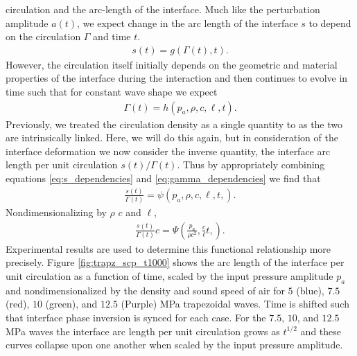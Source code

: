 \documentclass{jfm}%
\begin{document}
circulation and the arc-length of the interface. Much like the
perturbation amplitude $a(t)$, we expect change in the arc length of
the interface $s$ to depend on the circulation $\Gamma$ and time
$t$.
%
\begin{align}
  \label{eq:s_dependencies}%
  s(t) = g\left(\Gamma(t), t \right).%
\end{align}%
%
However, the circulation itself initially depends on the geometric and
material properties of the interface during the interaction and then
continues to evolve in time such that for constant wave shape we
expect
%
\begin{align}%
  \label{eq:gamma_dependencies}%
  \Gamma(t) = h\left(p_a, \rho, c, \ell, t\right).%
\end{align}%
%
Previously, we treated the circulation density as a single quantity to
as the two are intrinsically linked. Here, we will do this again, but
in consideration of the interface deformation we now consider the
inverse quantity, the interface arc length per unit circulation
$s(t)/\Gamma(t)$. Thus by appropriately combining equations
\eqref{eq:s_dependencies} and \eqref{eq:gamma_dependencies} we find
that
%
\begin{align}%
  \label{eq:scp_dependencies}%
  \frac{s(t)}{\Gamma(t)} = \psi\left(p_a,\rho, c, \ell, t,\right).
\end{align}%
%
Nondimensionalizing by $\rho$ $c$ and $\ell$,
%
\begin{align}%
  \label{eq:scp_dimensionless}%
  \frac{s(t)}{\Gamma(t)} c = \Psi\left(\frac{p_a}{\rho c^2},\frac{c}{\ell}t,\right).%
\end{align}%
%
Experimental results are used to determine this functional
relationship more precisely. Figure \ref{fig:trapz_scp_t1000} shows
the arc length of the interface per unit circulation as a function of
time, scaled by the input pressure amplitude $p_a$ and
nondimensionalized by the density and sound speed of air for $5$
(blue), $7.5$ (red), $10$ (green), and $12.5$ (Purple) MPa trapezoidal
waves. Time is shifted such that interface phase inversion is synced
for each case. For the $7.5$, $10$, and $12.5$ MPa waves the interface
arc length per unit circulation grows as $t^{1/2}$ and these curves
collapse upon one another when scaled by the input pressure
amplitude. 
\end{document}
